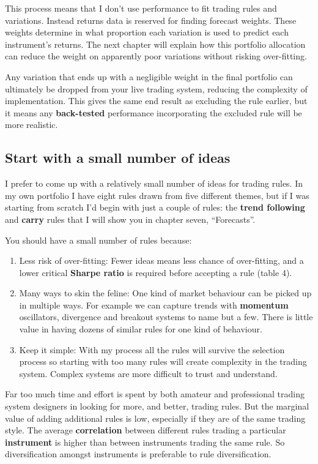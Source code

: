 This process means that I don't use performance to fit trading rules and variations. Instead returns data is reserved for finding forecast weights. These weights determine in what proportion each variation is used to predict each instrument's returns. The next chapter will explain how this portfolio allocation can reduce the weight on apparently poor variations without risking over-fitting.

Any variation that ends up with a negligible weight in the final portfolio can ultimately be dropped from your live trading system, reducing the complexity of implementation. This gives the same end result as excluding the rule earlier, but it means any \textbf{back-tested} performance incorporating the excluded rule will be more realistic.

\subsection*{Start with a small number of ideas}

I prefer to come up with a relatively small number of ideas for trading rules. In my own portfolio I have eight rules drawn from five different themes, but if I was starting from scratch I'd begin with just a couple of rules: the \textbf{trend following} and \textbf{carry} rules that I will show you in chapter seven, ``Forecasts''.

You should have a small number of rules because:

\begin{enumerate}
\item Less risk of over-fitting: Fewer ideas means less chance of over-fitting, and a lower critical \textbf{Sharpe ratio} is required before accepting a rule (table 4).
\item Many ways to skin the feline: One kind of market behaviour can be picked up in multiple ways. For example we can capture trends with \textbf{momentum} oscillators, divergence and breakout systems to name but a few. There is little value in having dozens of similar rules for one kind of behaviour.
\item Keep it simple: With my process all the rules will survive the selection process so starting with too many rules will create complexity in the trading system. Complex systems are more difficult to trust and understand. \end{enumerate}

Far too much time and effort is spent by both amateur and professional trading system designers in looking for more, and better, trading rules. But the marginal value of adding additional rules is low, especially if they are of the same trading style. The average \textbf{correlation} between different rules trading a particular \textbf{instrument} is higher than between instruments trading the same rule. So diversification amongst instruments is preferable to rule diversification.

